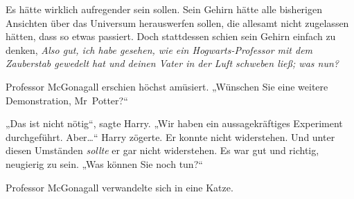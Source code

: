 Es hätte wirklich aufregender sein sollen. Sein Gehirn hätte alle bisherigen Ansichten über das Universum herauswerfen sollen, die allesamt nicht zugelassen hätten, dass so etwas passiert. Doch stattdessen schien sein Gehirn einfach zu denken, \emph{Also gut, ich habe gesehen, wie ein Hogwarts-Professor mit dem Zauberstab gewedelt hat und deinen Vater in der Luft schweben ließ; was nun?}

Professor McGonagall erschien höchst amüsiert. „Wünschen Sie eine weitere Demonstration, Mr~Potter?“

„Das ist nicht nötig“, sagte Harry. „Wir haben ein aussagekräftiges Experiment durchgeführt. Aber…“ Harry zögerte. Er konnte nicht widerstehen. Und unter diesen Umständen \emph{sollte} er gar nicht widerstehen. Es war gut und richtig, neugierig zu sein. „Was können Sie noch tun?“

Professor McGonagall verwandelte sich in eine Katze.

